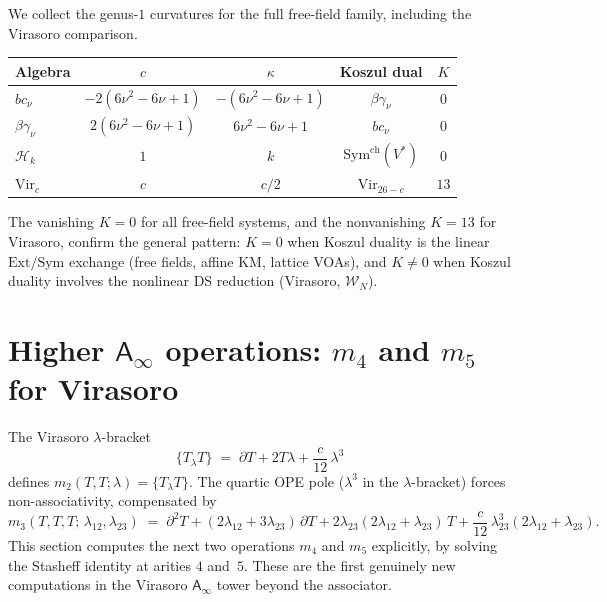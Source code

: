 \documentclass[11pt]{article}
\newcommand{\cW}{\mathcal{W}}
\newcommand{\cH}{\mathcal{H}}
\newcommand{\Ainf}{\mathsf{A}_{\infty}}
\begin{document}
We collect the genus-$1$ curvatures for the full free-field
family, including the Virasoro comparison.

\begin{center}
\renewcommand{\arraystretch}{1.3}
\begin{tabular}{lcccc}
\hline
Algebra & $c$ & $\kappa$ & Koszul dual & $K$ \\
\hline
$bc_\nu$ & $-2(6\nu^2 - 6\nu + 1)$
  & $-(6\nu^2 - 6\nu + 1)$
  & $\beta\gamma_\nu$ & $0$ \\[3pt]
$\beta\gamma_\nu$ & $2(6\nu^2 - 6\nu + 1)$
  & $6\nu^2 - 6\nu + 1$
  & $bc_\nu$ & $0$ \\[3pt]
$\cH_k$ & $1$ & $k$ & $\mathrm{Sym}^{\mathrm{ch}}(V^*)$ & $0$ \\[3pt]
$\mathrm{Vir}_c$ & $c$ & $c/2$ & $\mathrm{Vir}_{26-c}$ & $13$ \\
\hline
\end{tabular}
\end{center}
The vanishing $K = 0$ for all free-field systems, and the
nonvanishing $K = 13$ for Virasoro, confirm the general pattern:
$K = 0$ when Koszul duality is the linear
$\mathrm{Ext}/\mathrm{Sym}$ exchange (free fields, affine
KM, lattice VOAs), and $K \neq 0$ when Koszul duality involves
the nonlinear DS reduction (Virasoro, $\cW_N$).


\section{Higher $\Ainf$ operations: $m_4$ and $m_5$ for Virasoro}
\label{sec:higher-ainf-virasoro}

The Virasoro $\lambda$-bracket
\begin{equation}\label{eq:vir-lambda-wn2}
\{T{}_\lambda T\}
\;=\;
\partial T + 2T\lambda + \frac{c}{12}\,\lambda^3
\end{equation}
defines $m_2(T,T;\lambda) = \{T{}_\lambda T\}$.  The quartic OPE
pole ($\lambda^3$ in the $\lambda$-bracket) forces
non-associativity, compensated by
\[
m_3(T,T,T;\,\lambda_{12},\lambda_{23})
\;=\;
\partial^2 T
+ (2\lambda_{12} + 3\lambda_{23})\,\partial T
+ 2\lambda_{23}(2\lambda_{12} + \lambda_{23})\,T
+ \frac{c}{12}\,\lambda_{23}^3(2\lambda_{12} + \lambda_{23}).
\]
This section computes the next two operations $m_4$ and $m_5$
explicitly, by solving the Stasheff identity at arities $4$ and~$5$.
These are the first genuinely new computations in the Virasoro
$\Ainf$ tower beyond the associator.
\end{document}
